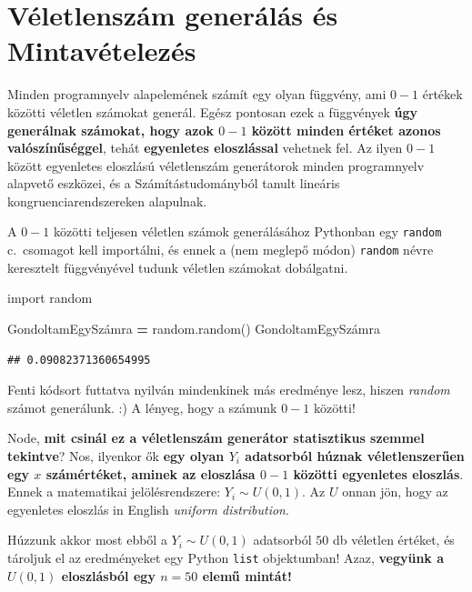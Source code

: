 \documentclass[
]{book}
\newenvironment{Shaded}{\begin{snugshade}}{\end{snugshade}}
\newcommand{\ImportTok}[1]{#1}
\newcommand{\NormalTok}[1]{#1}
\newcommand{\OperatorTok}[1]{\textcolor[rgb]{0.81,0.36,0.00}{\textbf{#1}}}
\begin{document}
\section{Véletlenszám generálás és Mintavételezés}\label{vuxe9letlenszuxe1m-generuxe1luxe1s-uxe9s-mintavuxe9telezuxe9s}

Minden programnyelv alapelemének számít egy olyan függvény, ami \(0-1\) értékek közötti véletlen számokat generál. Egész pontosan ezek a függvények \textbf{úgy generálnak számokat, hogy azok \(0-1\) között minden értéket azonos valószínűséggel}, tehát \textbf{egyenletes eloszlással} vehetnek fel.
Az ilyen \(0-1\) között egyenletes eloszlású véletlenszám generátorok minden programnyelv alapvető eszközei, és a Számítástudományból tanult lineáris kongruenciarendszereken alapulnak.

A \(0-1\) közötti teljesen véletlen számok generálásához Pythonban egy \texttt{random} c.~csomagot kell importálni, és ennek a (nem meglepő módon) \texttt{random} névre keresztelt függvényével tudunk véletlen számokat dobálgatni.

\begin{Shaded}
\begin{Highlighting}[]
\ImportTok{import}\NormalTok{ random}

\NormalTok{GondoltamEgySzámra }\OperatorTok{=}\NormalTok{ random.random()}
\NormalTok{GondoltamEgySzámra}
\end{Highlighting}
\end{Shaded}

\begin{verbatim}
## 0.09082371360654995
\end{verbatim}

Fenti kódsort futtatva nyilván mindenkinek más eredménye lesz, hiszen \emph{random} számot generálunk. :) A lényeg, hogy a számunk \(0-1\) közötti!

Node, \textbf{mit csinál ez a véletlenszám generátor statisztikus szemmel tekintve}? Nos, ilyenkor ők \textbf{egy olyan \(Y_i\) adatsorból húznak véletlenszerűen egy \(x\) számértéket, aminek az eloszlása \(0-1\) közötti egyenletes eloszlás}. Ennek a matematikai jelölésrendszere: \(Y_i \sim U(0,1)\). Az \(U\) onnan jön, hogy az egyenletes eloszlás in English \emph{uniform distribution}.

Húzzunk akkor most ebből a \(Y_i \sim U(0,1)\) adatsorból \(50\) db véletlen értéket, és tároljuk el az eredményeket egy Python \texttt{list} objektumban! Azaz, \textbf{vegyünk a \(U(0,1)\) eloszlásból egy \(n=50\) elemű mintát!}
\end{document}
